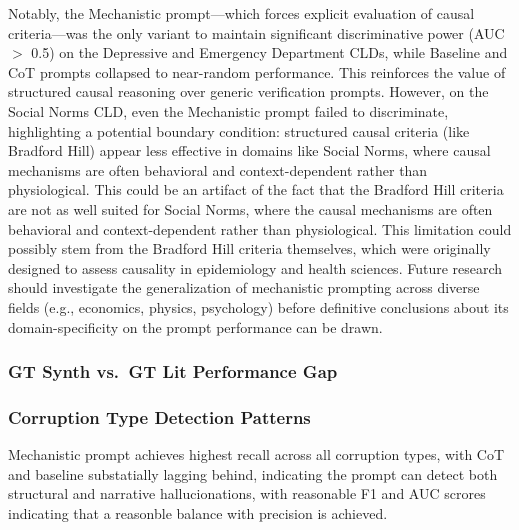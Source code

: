 Notably, the Mechanistic prompt---which forces explicit evaluation of causal criteria---was the only variant to maintain significant discriminative power (AUC $>$ 0.5) on the Depressive and Emergency Department CLDs, while Baseline and CoT prompts collapsed to near-random performance. This reinforces the value of structured causal reasoning over generic verification prompts. However, on the Social Norms CLD, even the Mechanistic prompt failed to discriminate, highlighting a potential boundary condition: structured causal criteria (like Bradford Hill) appear less effective in domains like Social Norms, where causal mechanisms are often behavioral and context-dependent rather than physiological. This could be an artifact of the fact that the Bradford Hill criteria are not as well suited for Social Norms, where the causal mechanisms are often behavioral and context-dependent rather than physiological. This limitation could possibly stem from the Bradford Hill criteria themselves, which were originally designed to assess causality in epidemiology and health sciences. Future research should investigate the generalization of mechanistic prompting across diverse fields (e.g., economics, physics, psychology) before definitive conclusions about its domain-specificity on the prompt performance can be drawn.

\subsubsection{GT Synth vs.\ GT Lit Performance Gap}

\subsubsection{Corruption Type Detection Patterns}

Mechanistic prompt achieves highest recall across all corruption types, with CoT and baseline substatially lagging behind, indicating the prompt can detect both structural and narrative hallucionations, with reasonable F1 and AUC scrores indicating that a reasonble balance with precision is achieved.

